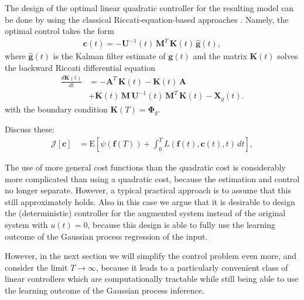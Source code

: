 \documentclass[journal]{IEEEtran}
\newcommand{\simo}[1]{{\color{red}#1}}
\begin{document}
%
The design of the optimal linear quadratic controller for the resulting model can be done by using the classical Riccati-equation-based approaches \cite{LQ}. Namely, the optimal control takes the form
%
\begin{equation}
\begin{split}
  \mathbf{c}(t) = -\mathbf{U}^{-1}(t) \, \mathbf{M}^T \, \mathbf{K}(t) \, \hat{\mathbf{g}}(t),
\end{split}
\end{equation}
%
where $\hat{\mathbf{g}}(t)$ is the Kalman filter estimate of $\mathbf{g}(t)$ and the matrix $\mathbf{K}(t)$ solves the backward Riccati differential equation
%
\begin{equation}
\begin{split}
  \frac{d\mathbf{K}(t)}{dt} &=
    -\mathbf{A}^T \, \mathbf{K}(t) - \mathbf{K}(t) \, \mathbf{A} \\
  &+  \mathbf{K}(t) \, \mathbf{M} \, \mathbf{U}^{-1}(t) \,
   \mathbf{M}^T \, \mathbf{K}(t) - \mathbf{X}_g(t).
\end{split}
\end{equation}
%
with the boundary condition $\mathbf{K}(T) =  \boldsymbol{\Phi}_g$.

\simo{Discuss these:}
%
\begin{equation}
\begin{split}
  \mathcal{J}[\mathbf{c}] &= \mathrm{E} \left[ \psi(\mathbf{f}(T))
   + \int_0^T L(\mathbf{f}(t),\mathbf{c}(t),t) \, dt \right],
\end{split}
\label{eq:quadcost1}
\end{equation}


The use of more general cost functions than the quadratic cost is considerably more complicated than using a quadratic cost, because the estimation and control no longer separate. However, a typical practical approach is to assume that this still approximately holds. Also in this case we argue that it is desirable to design the (deterministic) controller for the augmented system instead of the original system with $u(t) = 0$, because this design is able to fully use the learning outcome of the Gaussian process regression of the input.

However, in the next section we will simplify the control problem even more, and consider the limit $T \to \infty$, because it leads to a particularly convenient class of linear controllers which are computationally tractable while still being able to use the learning outcome of the Gaussian process inference.
\end{document}
